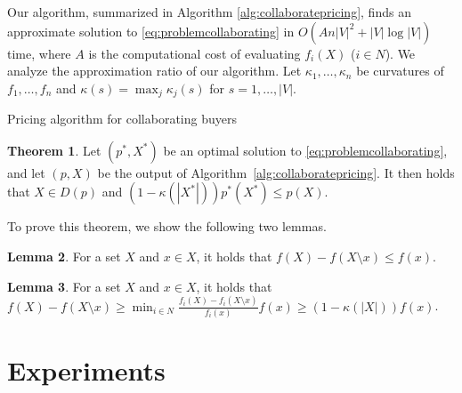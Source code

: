 \documentclass[letterpaper]{article}
\theoremstyle{definition}
\newtheorem{theorem}{Theorem}
\newtheorem{lemma}[theorem]{Lemma}
\begin{document}
Our algorithm, summarized in Algorithm \ref{alg:collaboratepricing},
finds an approximate solution to \eqref{eq:problemcollaborating}
in $O(A n |V|^2 + |V| \log |V|)$ time,
where $A$ is the computational cost of evaluating $f_i(X)$ ($i \in N$).
We analyze the approximation ratio of our algorithm.
Let $\kappa_1, \ldots, \kappa_n$ be curvatures of $f_1, \ldots, f_n$
and \(\kappa(s) = \max_j \kappa_j (s)\) for $s=1,\dots,|V|$.

\begin{algorithm}[tb]
\caption{Pricing algorithm for collaborating buyers}
\label{alg:collaboratepricing}
\begin{algorithmic}
\end{algorithmic}
\end{algorithm}

\begin{theorem}\label{thm:collaborating}
Let $(p^*, X^*)$ be an optimal solution to \eqref{eq:problemcollaborating},
and let $(p, X)$ be the output of Algorithm~\ref{alg:collaboratepricing}.
It then holds that \(X\in D(p)\) and
\((1 - \kappa(|X^*|)) p^*(X^*) \le p(X)\).
\end{theorem}

To prove this theorem, we show the following two lemmas.
\begin{lemma}\label{lem:collaborating 1}
For a set $X$ and $x\in X$, it holds that
$ f(X) - f(X \setminus x) \le f(x)$. %
\end{lemma}

\begin{lemma}\label{lem:collaborating 2}
For a set $X$ and $x\in X$, it holds that
$f(X) - f(X \setminus x) \ge \min_{i\in N}\frac{f_i(X)-f_i(X\setminus x)}{f_i(x)}f(x)
\ge (1 - \kappa(|X|)) f(x)$.
\end{lemma}


\section{Experiments}
\label{sec:experiments}
\end{document}
